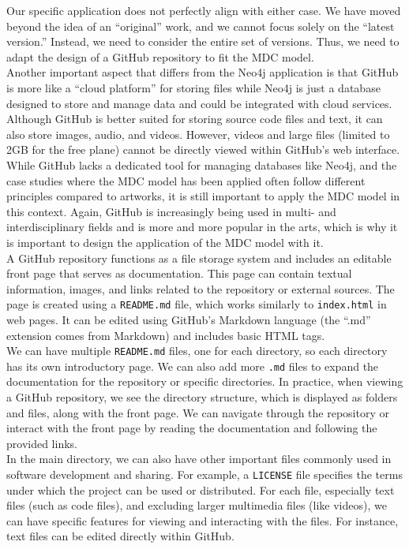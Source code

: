 Our specific application does not perfectly align with either case. We have moved beyond the idea of an ``original'' work, and we cannot focus solely on the ``latest version.'' Instead, we need to consider the entire set of versions. Thus, we need to adapt the design of a GitHub repository to fit the MDC model.\\
Another important aspect that differs from the Neo4j application is that GitHub is more like a ``cloud platform'' for storing files while Neo4j is just a database designed to store and manage data and could be integrated with cloud services. Although GitHub is better suited for storing source code files and text, it can also store images, audio, and videos. However, videos and large files (limited to 2GB for the free plane) cannot be directly viewed within GitHub’s web interface.\\
While GitHub lacks a dedicated tool for managing databases like Neo4j, and the case studies where the MDC model has been applied often follow different principles compared to artworks, it is still important to apply the MDC model in this context. Again, GitHub is increasingly being used in multi- and interdisciplinary fields and is more and more popular in the arts, which is why it is important to design the application of the MDC model with it.\\
\newline
A GitHub repository functions as a file storage system and includes an editable front page that serves as documentation. This page can contain textual information, images, and links related to the repository or external sources. The page is created using a \texttt{README.md} file, which works similarly to \texttt{index.html} in web pages. It can be edited using GitHub’s Markdown language (the ``.md'' extension comes from Markdown) and includes basic HTML tags.\\
We can have multiple \texttt{README.md} files, one for each directory, so each directory has its own introductory page. We can also add more \texttt{.md} files to expand the documentation for the repository or specific directories. In practice, when viewing a GitHub repository, we see the directory structure, which is displayed as folders and files, along with the front page. We can navigate through the repository or interact with the front page by reading the documentation and following the provided links.\\
In the main directory, we can also have other important files commonly used in software development and sharing. For example, a \texttt{LICENSE} file specifies the terms under which the project can be used or distributed. For each file, especially text files (such as code files), and excluding larger multimedia files (like videos), we can have specific features for viewing and interacting with the files. For instance, text files can be edited directly within GitHub.\\

